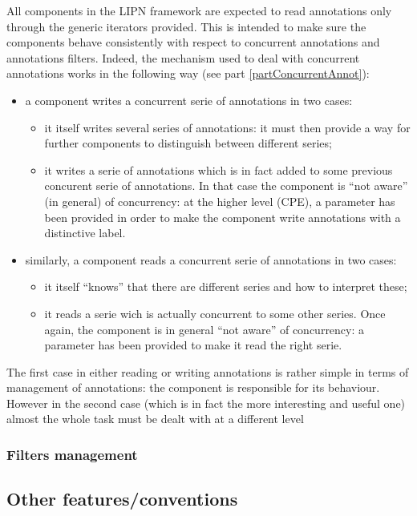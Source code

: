 \documentclass{article}
\begin{document}
All components in the LIPN framework are expected to read annotations only through the generic iterators provided. This is intended to make sure the components behave consistently with respect to concurrent annotations and annotations filters. Indeed, the mechanism used to deal with concurrent annotations works in the following way (see part \ref{partConcurrentAnnot}):

\begin{itemize}
\item a component writes a concurrent serie of annotations in two cases:
\begin{itemize}
\item it itself writes several series of annotations: it must then provide a way for further components to distinguish between different series;
\item it writes a serie of annotations which is in fact added to some previous concurent serie of annotations. In that case the component is ``not aware'' (in general) of concurrency: at the higher level (CPE), a parameter has been provided in order to make the component write annotations with a distinctive label. 
\end{itemize} 
\item similarly, a component reads a concurrent serie of annotations in two cases:
\begin{itemize}
\item it itself ``knows'' that there are different series and how to interpret these;
\item it reads a serie wich is actually concurrent to some other series. Once again, the component is in general ``not aware'' of concurrency: a parameter has been provided to make it read the right serie. 
\end{itemize}
\end{itemize}

The first case in either reading or writing annotations is rather simple in terms of management of annotations: the component is responsible for its behaviour. However in the second case (which is in fact the more interesting and useful one) almost the whole task must be dealt with at a different level

\subsubsection{Filters management}
\label{partAnnotationsFilters}


\subsection{Other features/conventions}
\end{document}
